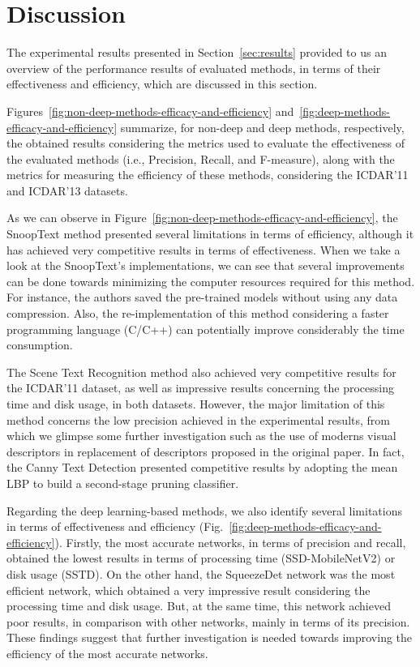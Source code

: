 \section{Discussion}
\label{sec:discussion}

The experimental results presented in Section~\ref{sec:results}  provided to us an overview of the performance results of evaluated methods, in terms of their effectiveness and efficiency, which are discussed in this section.

Figures~\ref{fig:non-deep-methods-efficacy-and-efficiency} and~\ref{fig:deep-methods-efficacy-and-efficiency} summarize, for non-deep and deep methods, respectively, the obtained results considering the metrics used to evaluate the effectiveness of the evaluated methods (i.e., Precision, Recall, and F-measure), along with
the metrics for measuring the efficiency of these methods, considering the ICDAR'11 and ICDAR'13 datasets. 

As we can observe in Figure~\ref{fig:non-deep-methods-efficacy-and-efficiency}, the SnoopText method presented several limitations in terms of efficiency,  although it has achieved very competitive results in terms of effectiveness.  When we take a look at the SnoopText's implementations, we can see that several improvements can be done towards minimizing the computer resources required for this method. For instance, the authors saved the pre-trained models without using any data compression. Also, the re-implementation of this method considering a faster programming language (C/C++) can potentially improve considerably the time consumption.

The Scene Text Recognition method also achieved very competitive results for the ICDAR'11 dataset, as well as impressive results concerning the processing time and disk usage, in both datasets. However, the major limitation of this method concerns the low precision achieved in the experimental results, from which we glimpse some further investigation such as the use of moderns visual descriptors in replacement of descriptors proposed in the original paper. In fact, the Canny Text Detection presented competitive results by adopting the mean LBP to build a second-stage pruning classifier.

Regarding the deep learning-based methods, we also identify several limitations in terms of effectiveness and efficiency (Fig.~\ref{fig:deep-methods-efficacy-and-efficiency}). Firstly, the most accurate networks, in terms of precision and recall, obtained the lowest results in terms of processing time (SSD-MobileNetV2) or disk usage (SSTD). On the other hand, the SqueezeDet network was the most efficient network, which obtained a very impressive result considering the processing time and disk usage. But, at the same time, this network achieved poor results, in comparison with other networks, mainly in terms of its precision. These findings suggest  that further investigation is needed towards improving the efficiency of the most accurate networks.

